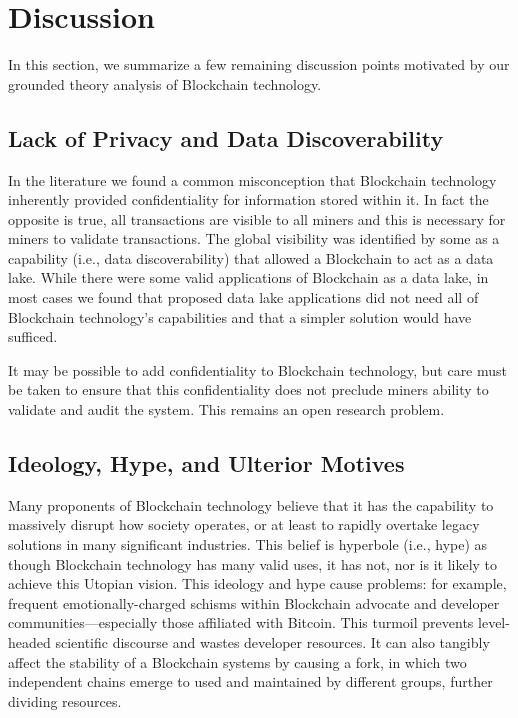 \section{Discussion}
In this section, we summarize a few remaining discussion points motivated by our grounded theory analysis of Blockchain technology.

\subsection{Lack of Privacy and Data Discoverability}
In the literature we found a common misconception that Blockchain technology inherently provided confidentiality for information stored within it.
In fact the opposite is true, all transactions are visible to all miners and this is necessary for miners to validate transactions.
The global visibility was identified by some as a capability (i.e., data discoverability) that allowed a Blockchain to act as a data lake.
While there were some valid applications of Blockchain as a data lake, in most cases we found that proposed data lake applications did not need all of Blockchain technology's capabilities and that a simpler solution would have sufficed.

It may be possible to add confidentiality to Blockchain technology, but care must be taken to ensure that this confidentiality does not preclude miners ability to validate and audit the system.
This remains an open research problem.

\subsection{Ideology, Hype, and Ulterior Motives}
Many proponents of Blockchain technology believe that it has the capability to massively disrupt how society operates, or at least to rapidly overtake legacy solutions in many significant industries. This belief is hyperbole (i.e., hype) as though Blockchain technology has many valid uses, it has not, nor is it likely to achieve this Utopian vision. This ideology and hype cause problems: for example, frequent emotionally-charged schisms within Blockchain advocate and developer communities---especially those affiliated with Bitcoin. This turmoil prevents level-headed scientific discourse and wastes developer resources. It can also tangibly affect the stability of a Blockchain systems by causing a fork, in which two independent chains emerge to used and maintained by different groups, further dividing resources.


